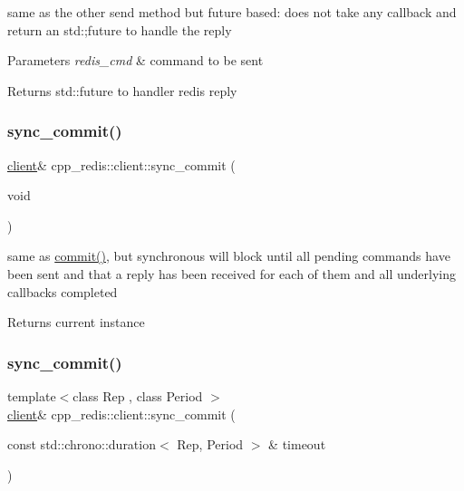 same as the other send method but future based\+: does not take any callback and return an std\+:;future to handle the reply


\begin{DoxyParams}{Parameters}
{\em redis\+\_\+cmd} & command to be sent \\
\hline
\end{DoxyParams}
\begin{DoxyReturn}{Returns}
std\+::future to handler redis reply 
\end{DoxyReturn}
\mbox{\label{classcpp__redis_1_1client_a23c8a27ee691c52713411ae91e1391fb}} 
\subsubsection{\texorpdfstring{sync\+\_\+commit()}{sync\_commit()}\hspace{0.1cm}{\footnotesize\ttfamily [1/2]}}
{\footnotesize\ttfamily \hyperlink{classcpp__redis_1_1client}{client}\& cpp\+\_\+redis\+::client\+::sync\+\_\+commit (\begin{DoxyParamCaption}\item[{void}]{ }\end{DoxyParamCaption})}

same as \hyperlink{classcpp__redis_1_1client_a36a48d61a4900e88fd67795ca59cbea3}{commit()}, but synchronous will block until all pending commands have been sent and that a reply has been received for each of them and all underlying callbacks completed

\begin{DoxyReturn}{Returns}
current instance 
\end{DoxyReturn}
\mbox{\label{classcpp__redis_1_1client_a79a24c8367cb1229fd2c4c38d0f82533}} 
\subsubsection{\texorpdfstring{sync\+\_\+commit()}{sync\_commit()}\hspace{0.1cm}{\footnotesize\ttfamily [2/2]}}
{\footnotesize\ttfamily template$<$class Rep , class Period $>$ \\
\hyperlink{classcpp__redis_1_1client}{client}\& cpp\+\_\+redis\+::client\+::sync\+\_\+commit (\begin{DoxyParamCaption}\item[{const std\+::chrono\+::duration$<$ Rep, Period $>$ \&}]{timeout }\end{DoxyParamCaption})\hspace{0.3cm}{\ttfamily [inline]}}

